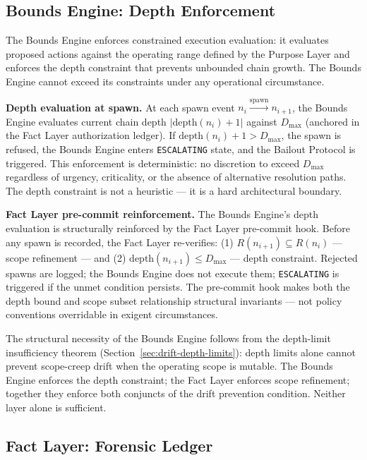 \subsection{Bounds Engine: Depth Enforcement}
\label{sec:bounds-depth}

The Bounds Engine enforces constrained execution evaluation: it evaluates proposed actions against the operating range defined by the Purpose Layer and enforces the depth constraint that prevents unbounded chain growth. The Bounds Engine cannot exceed its constraints under any operational circumstance.

\medskip
\noindent\textbf{Depth evaluation at spawn.} At each spawn event $n_i \xrightarrow{\text{spawn}} n_{i+1}$, the Bounds Engine evaluates current chain depth $|\text{depth}(n_i) + 1|$ against $D_{\max}$ (anchored in the Fact Layer authorization ledger). If $\text{depth}(n_i) + 1 > D_{\max}$, the spawn is refused, the Bounds Engine enters \texttt{ESCALATING} state, and the Bailout Protocol is triggered. This enforcement is deterministic: no discretion to exceed $D_{\max}$ regardless of urgency, criticality, or the absence of alternative resolution paths. The depth constraint is not a heuristic — it is a hard architectural boundary.

\medskip
\noindent\textbf{Fact Layer pre-commit reinforcement.} The Bounds Engine's depth evaluation is structurally reinforced by the Fact Layer pre-commit hook. Before any spawn is recorded, the Fact Layer re-verifies: (1) $R(n_{i+1}) \subseteq R(n_i)$ — scope refinement — and (2) $\text{depth}(n_{i+1}) \leq D_{\max}$ — depth constraint. Rejected spawns are logged; the Bounds Engine does not execute them; \texttt{ESCALATING} is triggered if the unmet condition persists. The pre-commit hook makes both the depth bound and scope subset relationship structural invariants — not policy conventions overridable in exigent circumstances.

The structural necessity of the Bounds Engine follows from the depth-limit insufficiency theorem (Section~\ref{sec:drift-depth-limits}): depth limits alone cannot prevent scope-creep drift when the operating scope is mutable. The Bounds Engine enforces the depth constraint; the Fact Layer enforces scope refinement; together they enforce both conjuncts of the drift prevention condition. Neither layer alone is sufficient.

\subsection{Fact Layer: Forensic Ledger}
\label{sec:fact-ledger}

